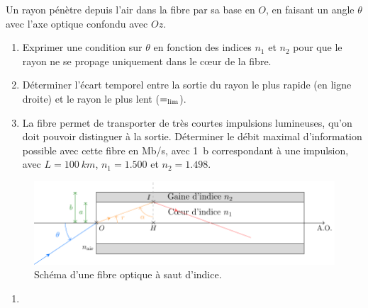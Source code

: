 \documentclass[../../main/main.tex]{subfiles}
\begin{document}
{	Un rayon pénètre depuis l'air dans la fibre par sa base en $O$, en faisant un
	angle $\theta$ avec l'axe optique confondu avec $Oz$.
	\begin{enumerate}
		\item Exprimer une condition sur $\theta$ en fonction des indices $n_1$ et
		      $n_2$ pour que le rayon ne se propage uniquement dans le cœur de la fibre.
		\item Déterminer l'écart temporel entre la sortie du rayon le plus rapide
		      (en ligne droite) et le rayon le plus lent ($\tt = \tt_{\lim}$).
		\item La fibre permet de transporter de très courtes impulsions lumineuses,
		      qu'on doit pouvoir distinguer à la sortie. Déterminer le débit maximal
		      d'information possible avec cette fibre en \si{Mb/s}, avec \SI{1}{b}
		      correspondant à une impulsion, avec $L = \SI{100}{km}$, $n_1 =
			      \num{1.500}$ et $n_2 = \num{1.498}$.
	\end{enumerate}
}{
	\begin{figure}[h]
		\centering
		\includegraphics[width=.8\linewidth]{fibre.pdf}
		\captionsetup{justification=centering}
		\caption{Schéma d'une fibre optique à saut d'indice.}
		\label{fig:fibre}
	\end{figure}
	\begin{enumerate}
		\item
		      \begin{tcolorbox}[blankest]
			      \begin{isd}
				      \begin{itemize}


\end{itemize}
\end{isd}
\end{tcolorbox}
\end{enumerate}}
\end{document}
